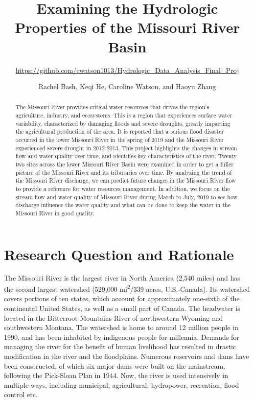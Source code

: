 \documentclass[12pt,]{article}
\title{Examining the Hydrologic Properties of the Missouri River Basin}
\subtitle{\url{https://github.com/cwatson1013/Hydrologic_Data_Analysis_Final_Proj}}
\author{Rachel Bash, Keqi He, Caroline Watson, and Haoyu Zhang}
\date{}
\begin{document}
\maketitle
\begin{abstract}
The Missouri River provides critical water resources that drives the
region's agriculture, industry, and ecosystems. This is a region that
experiences surface water variability, characterized by damaging floods
and severe droughts, greatly impacting the agricultural production of
the area. It is reported that a serious flood disaster occurred in the
lower Missouri River in the spring of 2019 and the Missouri River
experienced severe drought in 2012-2013. This project highlights the
changes in stream flow and water quality over time, and identifies key
characteristics of the river. Twenty two sites across the lower Missouri
River Basin were examined in order to get a fuller picture of the
Missouri River and its tributaries over time. By analyzing the trend of
the Missouri River discharge, we can predict future changes in the
Missouri River flow to provide a reference for water resources
management. In addition, we focus on the stream flow and water quality
of Missouri River during March to July, 2019 to see how discharge
influence the water quality and what can be done to keep the water in
the Missouri River in good quality.
\end{abstract}

\newpage
\tableofcontents 
\newpage
\listoftables 
\newpage
\listoffigures 
\newpage

\hypertarget{research-question-and-rationale}{%
\section{Research Question and
Rationale}\label{research-question-and-rationale}}

The Missouri River is the largest river in North America (2,540 miles)
and has the second largest watershed (529,000 mi\textsuperscript{2}/339
acres, U.S.-Canada). Its watershed covers portions of ten states, which
account for approximately one-sixth of the continental United States, as
well as a small part of Canada. The headwater is located in the
Bitterroot Mountains River of northwestern Wyoming and southwestern
Montana. The watershed is home to around 12 million people in 1990, and
has been inhabited by indigenous people for millennia. Demands for
managing the river for the benefit of human livelihood has resulted in
drastic modification in the river and the floodplains. Numerous
reservoirs and dams have been constructed, of which six major dams were
built on the mainstream, following the Pick-Sloan Plan in 1944. Now, the
river is used intensively in multiple ways, including municipal,
agricultural, hydropower, recreation, flood control etc.
\end{document}

